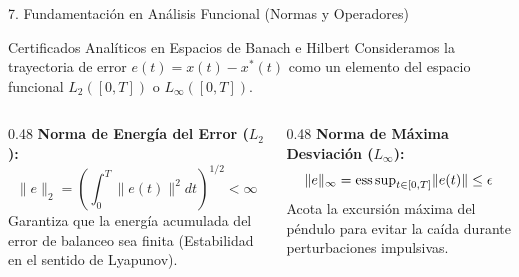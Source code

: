 \documentclass[10pt,aspectratio=169]{beamer}
\begin{document}
\begin{frame}{7. Fundamentación en Análisis Funcional (Normas y Operadores)}
  \begin{block}{Certificados Analíticos en Espacios de Banach e Hilbert}
    Consideramos la trayectoria de error $e(t) = x(t) - x^*(t)$ como un elemento del espacio funcional $L_2([0, T])$ o $L_\infty([0, T])$.
  \end{block}

  \vspace{0.2cm}
  \begin{columns}[T]
    \begin{column}{0.48\textwidth}
      \textbf{Norma de Energía del Error ($L_2$):}
      \begin{equation*}
        \|e\|_2 = \left( \int_0^T \|e(t)\|^2 dt \right)^{1/2} < \infty
      \end{equation*}
      \small Garantiza que la energía acumulada del error de balanceo sea finita (Estabilidad en el sentido de Lyapunov).
    \end{column}
    \begin{column}{0.48\textwidth}
      \textbf{Norma de Máxima Desviación ($L_\infty$):}
      \begin{equation*}
        \|e\|_\infty = \text{ess\,sup}_{t \in [0,T]} \|e(t)\| \le \epsilon
      \end{equation*}
      \small Acota la excursión máxima del péndulo para evitar la caída durante perturbaciones impulsivas.
    \end{column}
  \end{columns}
\end{frame}
\end{document}

